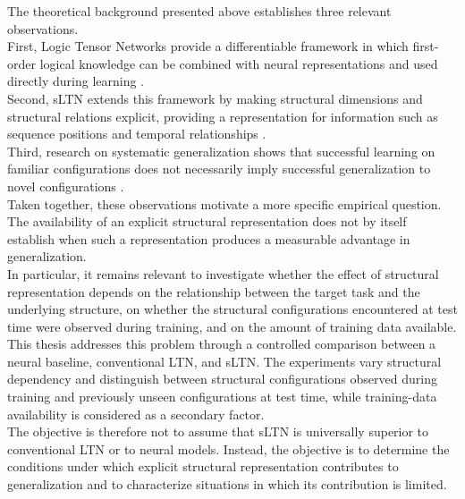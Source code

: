 \noindent
The theoretical background presented above establishes three relevant observations.
\\
First, Logic Tensor Networks provide a differentiable framework in which first-order logical knowledge can be combined with neural representations and used directly during learning \cite{badreddine2022logic}.
\\
Second, sLTN extends this framework by making structural dimensions and structural relations explicit, providing a representation for information such as sequence positions and temporal relationships \cite{rinaldi2026sltn}.
\\
Third, research on systematic generalization shows that successful learning on familiar configurations does not necessarily imply successful generalization to novel configurations \cite{lake2018generalization}.
\\
Taken together, these observations motivate a more specific empirical question. The availability of an explicit structural representation does not by itself establish when such a representation produces a measurable advantage in generalization.
\\
In particular, it remains relevant to investigate whether the effect of structural representation depends on the relationship between the target task and the underlying structure, on whether the structural configurations encountered at test time were observed during training, and on the amount of training data available.
\\
This thesis addresses this problem through a controlled comparison between a neural baseline, conventional LTN, and sLTN. The experiments vary structural dependency and distinguish between structural configurations observed during training and previously unseen configurations at test time, while training-data availability is considered as a secondary factor.
\\
The objective is therefore not to assume that sLTN is universally superior to conventional LTN or to neural models. Instead, the objective is to determine the conditions under which explicit structural representation contributes to generalization and to characterize situations in which its contribution is limited.
